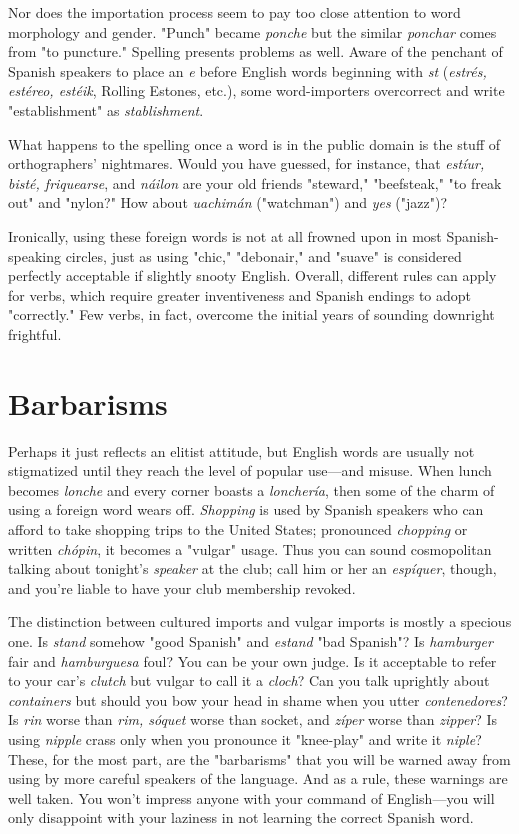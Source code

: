 Nor does the importation process seem to pay too close attention to word morphology and gender. "Punch" became \emph{ponche} but the
similar \emph{ponchar} comes from "to puncture." Spelling presents problems
as well. Aware of the penchant of Spanish speakers to place an \emph{e} before English words beginning with \emph{st} (\emph{estrés, estéreo, estéik}, Rolling
Estones, etc.), some word-importers overcorrect and write "establishment" as \emph{stablishment}.

What happens to the spelling once a word is in the public
domain is the stuff of orthographers' nightmares. Would you have
guessed, for instance, that \emph{estíur, bisté, friquearse}, and \emph{náilon} are your
old friends "steward," "beefsteak," "to freak out" and "nylon?" How
about \emph{uachimán} ("watchman") and \emph{yes} ("jazz")?

Ironically, using these foreign words is not at all frowned upon
in most Spanish-speaking circles, just as using "chic," "debonair," and
"suave" is considered perfectly acceptable if slightly snooty English.
Overall, different rules can apply for verbs, which require greater inventiveness and Spanish endings to adopt "correctly." Few verbs, in
fact, overcome the initial years of sounding downright frightful.

\section{Barbarisms}

Perhaps it just reflects an elitist attitude, but English words
are usually not stigmatized until they reach the level of popular
use---and misuse. When lunch becomes \emph{lonche} and every corner
boasts a \emph{lonchería}, then some of the charm of using a foreign word
wears off. \emph{Shopping} is used by Spanish speakers who can afford to take
shopping trips to the United States; pronounced \emph{chopping} or written
\emph{chópin}, it becomes a "vulgar" usage. Thus you can sound cosmopolitan talking about tonight's \emph{speaker} at the club; call him or her an \emph{espíquer}, though, and you're liable to have your club membership revoked.

The distinction between cultured imports and vulgar imports is mostly a specious one. Is \emph{stand} somehow "good Spanish" and
\emph{estand} "bad Spanish"? Is \emph{hamburger} fair and \emph{hamburguesa} foul? You
can be your own judge. Is it acceptable to refer to your car's \emph{clutch} but
vulgar to call it a \emph{cloch}? Can you talk uprightly about \emph{containers} but
should you bow your head in shame when you utter \emph{contenedores}? Is
\emph{rin} worse than \emph{rim, sóquet} worse than socket, and \emph{zíper} worse than
\emph{zipper}? Is using \emph{nipple} crass only when you pronounce it "knee-play"
and write it \emph{niple}? These, for the most part, are the "barbarisms" that
you will be warned away from using by more careful speakers of the
language. And as a rule, these warnings are well taken. You won't impress anyone with your command of English---you will only disappoint
with your laziness in not learning the correct Spanish word.

